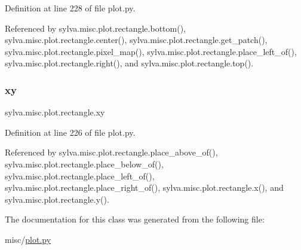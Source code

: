 Definition at line 228 of file plot.\+py.



Referenced by sylva.\+misc.\+plot.\+rectangle.\+bottom(), sylva.\+misc.\+plot.\+rectangle.\+center(), sylva.\+misc.\+plot.\+rectangle.\+get\+\_\+patch(), sylva.\+misc.\+plot.\+rectangle.\+pixel\+\_\+map(), sylva.\+misc.\+plot.\+rectangle.\+place\+\_\+left\+\_\+of(), sylva.\+misc.\+plot.\+rectangle.\+right(), and sylva.\+misc.\+plot.\+rectangle.\+top().

\mbox{\label{classsylva_1_1misc_1_1plot_1_1rectangle_a1bf48f6505e5a549e1056f6a8cb0b454}} 
\subsubsection{\texorpdfstring{xy}{xy}}
{\footnotesize\ttfamily sylva.\+misc.\+plot.\+rectangle.\+xy}



Definition at line 226 of file plot.\+py.



Referenced by sylva.\+misc.\+plot.\+rectangle.\+place\+\_\+above\+\_\+of(), sylva.\+misc.\+plot.\+rectangle.\+place\+\_\+below\+\_\+of(), sylva.\+misc.\+plot.\+rectangle.\+place\+\_\+left\+\_\+of(), sylva.\+misc.\+plot.\+rectangle.\+place\+\_\+right\+\_\+of(), sylva.\+misc.\+plot.\+rectangle.\+x(), and sylva.\+misc.\+plot.\+rectangle.\+y().



The documentation for this class was generated from the following file\+:\begin{DoxyCompactItemize}
\item 
misc/\hyperlink{plot_8py}{plot.\+py}\end{DoxyCompactItemize}
